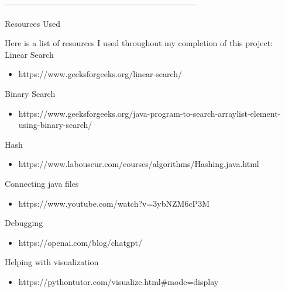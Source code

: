 \documentclass{article}
\begin{document}
\begin{center}
    -----------------------------------------------------------------------
\end{center}

\pagebreak

\begin{center}
\begin{large}
    Resources Used
\end{large}
\end{center}

Here is a list of resources I used throughout my completion of this project:\\

Linear Search
    \begin{itemize}
        \item https://www.geeksforgeeks.org/linear-search/
    \end{itemize}

Binary Search
    \begin{itemize}
        \item https://www.geeksforgeeks.org/java-program-to-search-arraylist-element-using-binary-search/
    \end{itemize}

Hash
    \begin{itemize}
        \item https://www.labouseur.com/courses/algorithms/Hashing.java.html
    \end{itemize}
    
Connecting java files
    \begin{itemize}
        \item https://www.youtube.com/watch?v=3ybNZM6cP3M 
    \end{itemize}
Debugging
    \begin{itemize}
        \item https://openai.com/blog/chatgpt/ 
    \end{itemize}
Helping with visualization 
    \begin{itemize}
        \item https://pythontutor.com/visualize.html#mode=display
    \end{itemize}
\end{document}
